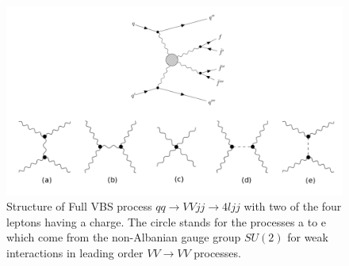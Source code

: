 \documentclass[../Bachelorarbeit.tex]{subfiles}
\begin{document}
\label{sec:VBS}

\begin{figure}[h]
    \centering
    \includegraphics[width=\textwidth]{images/feynman_full_VBS.png}
    \caption{Structure of Full VBS process $qq\rightarrow VVjj\rightarrow 4ljj$ with two of the four leptons having a charge. The circle stands for the processes a to e
        which come from the non-Albanian gauge group $SU(2)$ for weak interactions in leading order $VV \rightarrow VV$ processes.\cite{Bittrich.27.05.2020}}
    \label{fig:feynman_full_VBS}
\end{figure}
\end{document}
